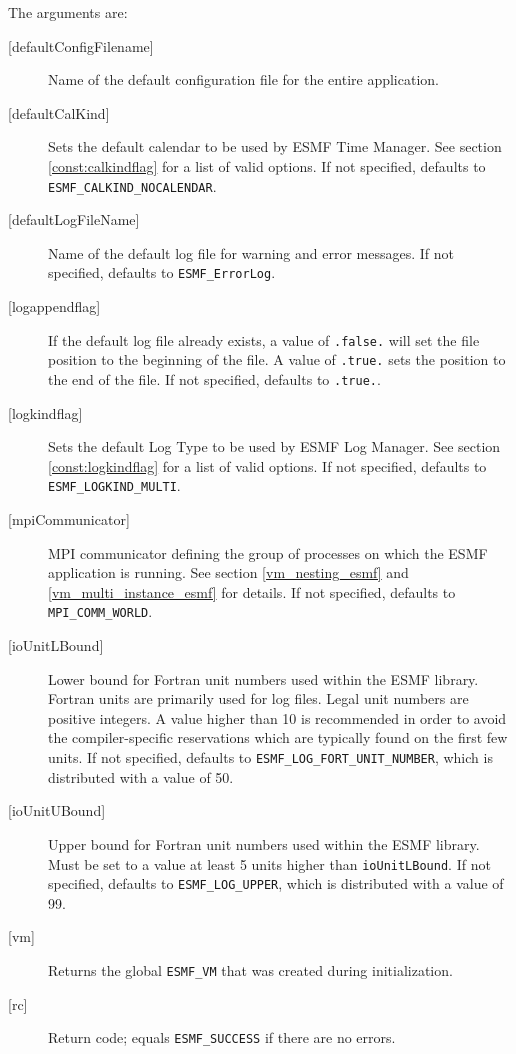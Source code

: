        The arguments are:
       \begin{description}
       \item [{[defaultConfigFilename]}]
             Name of the default configuration file for the entire application.
       \item [{[defaultCalKind]}]
             Sets the default calendar to be used by ESMF Time Manager.
             See section \ref{const:calkindflag} for a list of valid options.
             If not specified, defaults to {\tt ESMF\_CALKIND\_NOCALENDAR}.
       \item [{[defaultLogFileName]}]
             Name of the default log file for warning and error messages.
             If not specified, defaults to {\tt ESMF\_ErrorLog}.
       \item [{[logappendflag]}]
             If the default log file already exists, a value of {\tt .false.}
             will set the file position to the beginning of the file.  A value
             of {\tt .true.} sets the position to the end of the file.
             If not specified, defaults to {\tt .true.}.
       \item [{[logkindflag]}]
             Sets the default Log Type to be used by ESMF Log Manager.
             See section \ref{const:logkindflag} for a list of valid options.
             If not specified, defaults to {\tt ESMF\_LOGKIND\_MULTI}.
       \item [{[mpiCommunicator]}]
             MPI communicator defining the group of processes on which the
             ESMF application is running.
             See section \ref{vm_nesting_esmf} and \ref{vm_multi_instance_esmf}
             for details.
             If not specified, defaults to {\tt MPI\_COMM\_WORLD}.
       \item [{[ioUnitLBound]}]
             Lower bound for Fortran unit numbers used within the ESMF library.
             Fortran units are primarily used for log files.  Legal unit numbers
             are positive integers.  A value higher than 10 is recommended
             in order to avoid the compiler-specific
             reservations which are typically found on the first few units.
             If not specified, defaults to {\tt ESMF\_LOG\_FORT\_UNIT\_NUMBER},
             which is distributed with a value of 50.
       \item [{[ioUnitUBound]}]
             Upper bound for Fortran unit numbers used within the ESMF library.
             Must be set to a value at least 5 units higher than {\tt ioUnitLBound}.
             If not specified, defaults to {\tt ESMF\_LOG\_UPPER}, which is
             distributed with a value of 99.
       \item [{[vm]}]
             Returns the global {\tt ESMF\_VM} that was created 
             during initialization.
       \item [{[rc]}]
             Return code; equals {\tt ESMF\_SUCCESS} if there are no errors.
  
       \end{description} 
 
